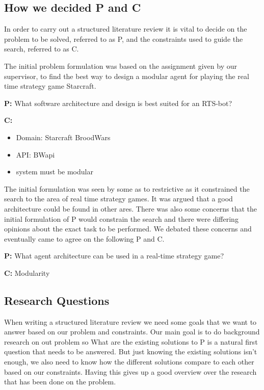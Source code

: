 \subsection{How we decided P and C}
\label{sub:how_we_decided_p_and_c}
In order to carry out a structured literature review it is vital to decide on the problem to be solved, referred to as P, and the constraints used to guide the search, referred to as C.

The initial problem formulation was based on the assignment given by our supervisor, to find the best way to design a modular agent for playing the real time strategy game Starcraft.  

\textbf{P:} What software architecture and design is best suited for an RTS-bot?

\textbf{C:}
\begin{itemize}
\item Domain: Starcraft BroodWars
\item API: BWapi
\item system must be modular	
\end{itemize}

The initial formulation was seen by some as to restrictive as it constrained the search to the area of real time strategy games. It was argued that a good architecture could be found in other ares. There was also some concerns that the initial formulation of P would constrain the search and there were differing opinions about the exact task to be performed. We debated these concerns and eventually came to agree on the following P and C.

\textbf{P:} What agent architecture can be used in a real-time strategy game?

\textbf{C:} Modularity

\subsection{Research Questions}
\label{sub:research_questions}
When writing a structured literature review we need some goals that we want to answer based on our problem and constraints. Our main goal is to do background research on out problem so What are the existing solutions to P is a natural first question that needs to be answered. But just knowing the existing solutions isn’t enough, we also need to know how the different solutions compare to each other based on our constraints. Having this gives up a good overview over the research that has been done on the problem. 

